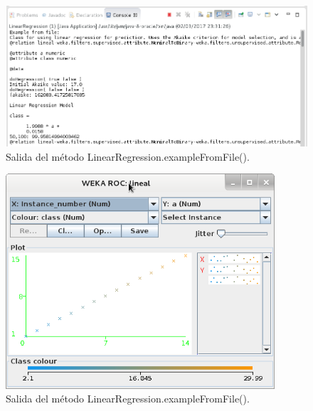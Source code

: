 \begin{figure}[h]
	\centering
	\includegraphics[width=16cm]{img/salidaMetodoLinearRegression.png}
	\caption{Salida del método LinearRegression.exampleFromFile().}
	\label{fig:salidaMetodoLinearRegression}
\end{figure}

\begin{figure}[h]
	\centering
	\includegraphics[width=10cm]{img/representacionGraficaDatosLinearR.png}
	\caption{Salida del método LinearRegression.exampleFromFile().}
	\label{fig:representacionGraficaDatosLinearR}
\end{figure}
\clearpage


